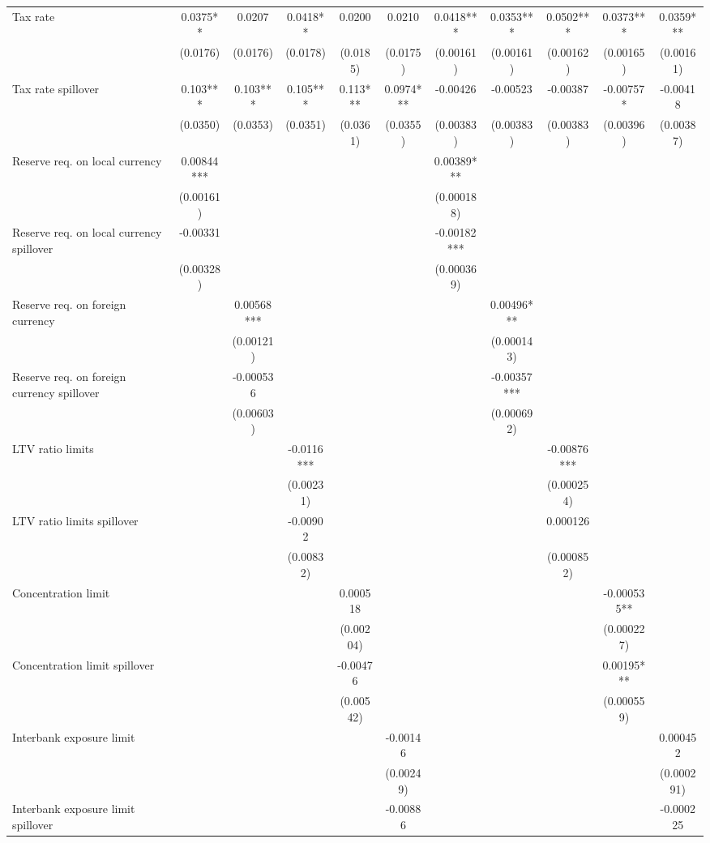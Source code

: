 \begin{tabular}{lcccccccccc}
Tax rate & 0.0375** & 0.0207 & 0.0418** & 0.0200 & 0.0210 & 0.0418*** & 0.0353*** & 0.0502*** & 0.0373*** & 0.0359*** \\
 & (0.0176) & (0.0176) & (0.0178) & (0.0185) & (0.0175) & (0.00161) & (0.00161) & (0.00162) & (0.00165) & (0.00161) \\
Tax rate spillover & 0.103*** & 0.103*** & 0.105*** & 0.113*** & 0.0974*** & -0.00426 & -0.00523 & -0.00387 & -0.00757* & -0.00418 \\
 & (0.0350) & (0.0353) & (0.0351) & (0.0361) & (0.0355) & (0.00383) & (0.00383) & (0.00383) & (0.00396) & (0.00387) \\
Reserve req. on local currency & 0.00844*** &  &  &  &  & 0.00389*** &  &  &  &  \\
 & (0.00161) &  &  &  &  & (0.000188) &  &  &  &  \\
Reserve req. on local currency spillover & -0.00331 &  &  &  &  & -0.00182*** &  &  &  &  \\
 & (0.00328) &  &  &  &  & (0.000369) &  &  &  &  \\
Reserve req. on foreign currency &  & 0.00568*** &  &  &  &  & 0.00496*** &  &  &  \\
 &  & (0.00121) &  &  &  &  & (0.000143) &  &  &  \\
Reserve req. on foreign currency spillover &  & -0.000536 &  &  &  &  & -0.00357*** &  &  &  \\
 &  & (0.00603) &  &  &  &  & (0.000692) &  &  &  \\
LTV ratio limits &  &  & -0.0116*** &  &  &  &  & -0.00876*** &  &  \\
 &  &  & (0.00231) &  &  &  &  & (0.000254) &  &  \\
LTV ratio limits spillover &  &  & -0.00902 &  &  &  &  & 0.000126 &  &  \\
 &  &  & (0.00832) &  &  &  &  & (0.000852) &  &  \\
Concentration limit &  &  &  & 0.000518 &  &  &  &  & -0.000535** &  \\
 &  &  &  & (0.00204) &  &  &  &  & (0.000227) &  \\
Concentration limit spillover &  &  &  & -0.00476 &  &  &  &  & 0.00195*** &  \\
 &  &  &  & (0.00542) &  &  &  &  & (0.000559) &  \\
Interbank exposure limit &  &  &  &  & -0.00146 &  &  &  &  & 0.000452 \\
 &  &  &  &  & (0.00249) &  &  &  &  & (0.000291) \\
Interbank exposure limit spillover &  &  &  &  & -0.00886 &  &  &  &  & -0.000225 \\

\end{tabular}
